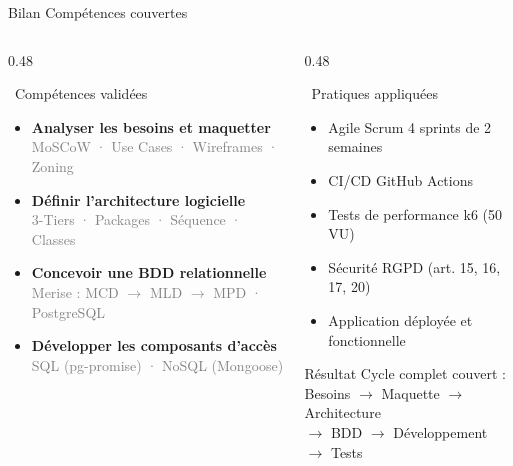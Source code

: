 \documentclass[aspectratio=169]{beamer}
\begin{document}
\begin{frame}{Bilan  Compétences couvertes}
  \begin{columns}[t]
    \begin{column}{0.48\textwidth}
      \begin{block}{\faCheckCircle\ Compétences validées}
        \begin{itemize}
          \item \textbf{Analyser les besoins et maquetter}\\
                \textcolor{gray}{\small MoSCoW · Use Cases · Wireframes · Zoning}
          \vspace{0.15cm}
          \item \textbf{Définir l'architecture logicielle}\\
                \textcolor{gray}{\small 3-Tiers · Packages · Séquence · Classes}
          \vspace{0.15cm}
          \item \textbf{Concevoir une BDD relationnelle}\\
                \textcolor{gray}{\small Merise : MCD $\to$ MLD $\to$ MPD · PostgreSQL}
          \vspace{0.15cm}
          \item \textbf{Développer les composants d'accès}\\
                \textcolor{gray}{\small SQL (pg-promise) · NoSQL (Mongoose)}
        \end{itemize}
      \end{block}
    \end{column}
    \begin{column}{0.48\textwidth}
      \begin{block}{\faCogs\ Pratiques appliquées}
        \begin{itemize}
          \item Agile Scrum  4 sprints de 2 semaines
          \item CI/CD GitHub Actions
          \item Tests de performance k6 (50 VU)
          \item Sécurité RGPD (art. 15, 16, 17, 20)
          \item Application déployée et fonctionnelle
        \end{itemize}
      \end{block}
      \vspace{0.3cm}
      \begin{alertblock}{\centering Résultat}
        \centering\small
        Cycle complet couvert :\\
        Besoins $\to$ Maquette $\to$ Architecture\\
        $\to$ BDD $\to$ Développement $\to$ Tests
      \end{alertblock}
    \end{column}
  \end{columns}
\end{frame}
\end{document}

